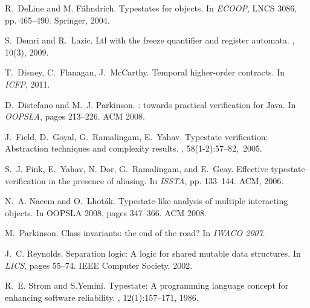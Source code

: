 \documentclass{llncs} %
\begin{document}
\begin{thebibliography}{10}
R.~DeLine and M. F{\"a}hndrich.
\newblock Typestates for objects.
\newblock In {\em ECOOP}, LNCS 3086, pp. 465--490. Springer, 2004.

S.~Demri and R.~Lazic.
\newblock Ltl with the freeze quantifier and register automata.
, 10(3), 2009.

T.~Disney, C.~Flanagan, J.~McCarthy.
\newblock Temporal higher-order contracts.
\newblock In {\em ICFP}, 2011.

D.~Distefano and M.~J. Parkinson.
: towards practical verification for {Java}.
\newblock In {\em OOPSLA}, pages 213--226. ACM 2008.

J.~Field, D.~Goyal, G.~Ramalingam, E.~Yahav.
\newblock Typestate verification: Abstraction techniques and complexity
  results.
, 58(1-2):57--82,~2005.

S.~J. Fink, E.~Yahav, N. Dor, G.~Ramalingam, and E.~Geay.
\newblock Effective typestate verification in the presence of aliasing.
\newblock In  {\em ISSTA}, pp. 133--144. ACM, 2006.


N.~A. Naeem and O.~Lhot{\'a}k.
\newblock Typestate-like analysis of multiple interacting objects.
\newblock In OOPSLA 2008, pages 347--366. ACM 2008.

M.~Parkinson.
\newblock Class invariants: the end of the road?
\newblock In {\em IWACO 2007}.


J.~C. Reynolds.
\newblock Separation logic: A logic for shared mutable data structures.
\newblock In {\em LICS}, pages 55--74. IEEE Computer Society, 2002.

R.~E. Strom and S.Yemini.
\newblock Typestate: A programming language concept for enhancing software
  reliability.
, 12(1):157--171, 1986.

%
%
\end{thebibliography}
\end{document}

